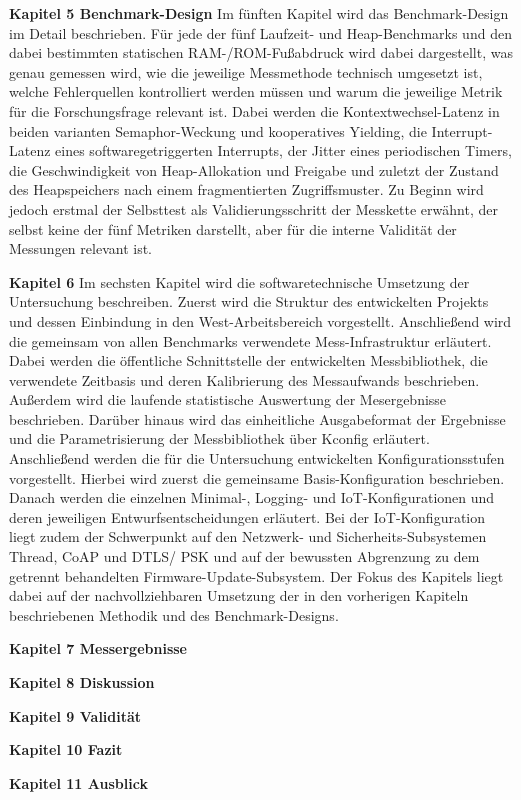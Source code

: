 \textbf{Kapitel 5 Benchmark-Design }Im f{\"u}nften Kapitel wird das Benchmark-Design im Detail beschrieben. F{\"u}r jede der f{\"u}nf Laufzeit- und Heap-Benchmarks und den dabei bestimmten statischen RAM-/ROM-Fu{\ss}abdruck wird dabei dargestellt, was genau gemessen wird, wie die jeweilige Messmethode technisch umgesetzt ist, welche Fehlerquellen kontrolliert werden m{\"u}ssen und warum die jeweilige Metrik f{\"u}r die Forschungsfrage relevant ist. Dabei werden die Kontextwechsel-Latenz in beiden varianten Semaphor-Weckung und kooperatives Yielding, die Interrupt-Latenz eines softwaregetriggerten Interrupts, der Jitter eines periodischen Timers, die Geschwindigkeit von Heap-Allokation und Freigabe und zuletzt der Zustand des Heapspeichers nach einem fragmentierten Zugriffsmuster. Zu Beginn wird jedoch erstmal der Selbsttest als Validierungsschritt der Messkette erw{\"a}hnt, der selbst keine der f{\"u}nf Metriken darstellt, aber f{\"u}r die interne Validit{\"a}t der Messungen relevant ist. 

\textbf{Kapitel 6 }Im sechsten Kapitel wird die softwaretechnische Umsetzung der Untersuchung beschreiben. Zuerst wird die Struktur des entwickelten Projekts und dessen Einbindung in den West-Arbeitsbereich vorgestellt. Anschlie{\ss}end wird die gemeinsam von allen Benchmarks verwendete Mess-Infrastruktur erl{\"a}utert. Dabei werden die {\"o}ffentliche Schnittstelle der entwickelten Messbibliothek, die verwendete Zeitbasis und deren Kalibrierung des Messaufwands beschrieben. Au{\ss}erdem wird die laufende statistische Auswertung der Mesergebnisse beschrieben. Dar{\"u}ber hinaus wird das einheitliche Ausgabeformat der Ergebnisse und die Parametrisierung der Messbibliothek {\"u}ber Kconfig erl{\"a}utert. Anschlie{\ss}end werden die f{\"u}r die Untersuchung entwickelten Konfigurationsstufen vorgestellt. Hierbei wird zuerst die gemeinsame Basis-Konfiguration beschrieben. Danach werden die einzelnen Minimal-, Logging- und IoT-Konfigurationen und deren jeweiligen Entwurfsentscheidungen erl{\"a}utert. Bei der IoT-Konfiguration liegt zudem der Schwerpunkt auf den Netzwerk- und Sicherheits-Subsystemen Thread, CoAP und DTLS/ PSK und auf der bewussten Abgrenzung zu dem getrennt behandelten Firmware-Update-Subsystem. Der Fokus des Kapitels liegt dabei auf der nachvollziehbaren Umsetzung der in den vorherigen Kapiteln beschriebenen Methodik und des Benchmark-Designs.

\textbf{Kapitel 7 Messergebnisse}

\textbf{Kapitel 8 Diskussion}

\textbf{Kapitel 9 Validit{\"a}t}

\textbf{Kapitel 10 Fazit}

\textbf{Kapitel 11 Ausblick}
